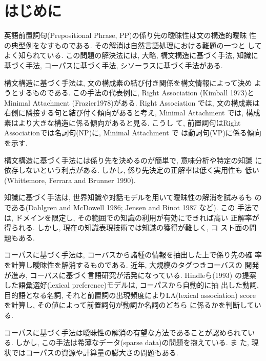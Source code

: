 

\maketitle

\section{はじめに}

英語前置詞句(Prepositional Phrase, PP)の係り先の曖昧性は文の構造的曖昧
性の典型例をなすものである. その解消は自然言語処理における難題の一つと
してよく知られている. この問題の解決法には, 大略, 構文構造に基づく手法, 
知識に基づく手法, コーパスに基づく手法, シソーラスに基づく手法がある.

構文構造に基づく手法は, 文の構成素の結び付き関係を構文情報によって決め
ようとするものである. この手法の代表例に, Right Association (Kimball
1973)とMinimal Attachment (Frazier1978)がある. Right Association では, 
文の構成素は右側に隣接する句と結び付く傾向があると考え, Minimal
Attachment では, 構成素はより大きな構造に係る傾向があると見る. こうし
て, 前置詞句はRight Associationでは名詞句(NP)に, Minimal Attachment で
は動詞句(VP)に係る傾向を示す. 

構文構造に基づく手法には係り先を決めるのが簡単で, 意味分析や特定の知識
に依存しないという利点がある. しかし, 係り先決定の正解率は低く実用性も
低い(Whittemore, Ferrara and Brunner 1990).   

知識に基づく手法は, 世界知識や対話モデルを用いて曖昧性の解消を試みるも
のである(Dahlgren and McDowell 1986; Jensen and Binot 1987 など). この
手法では, ドメインを限定し, その範囲での知識の利用が有効にできれば高い
正解率が得られる. しかし, 現在の知識表現技術では知識の獲得が難しく, コ
スト面の問題もある. 

コーパスに基づく手法は, コーバスから諸種の情報を抽出した上で係り先の確
率を計算し曖昧性を解消するものである. 近年, 大規模のタグつきコーバスの
開発が進み, コーパスに基づく言語研究が活発になっている. Hindleら(1993)
の提案した語彙選好(lexical preference)モデルは, コーパスから自動的に抽
出した動詞, 目的語となる名詞, それと前置詞の出現頻度によりLA(lexical
association) scoreを計算し, その値によって前置詞句が動詞か名詞のどちら
に係るかを判断している. 

コーパスに基づく手法は曖昧性の解消の有望な方法であることが認められてい
る. しかし, この手法は希薄なデータ(sparse data)の問題を抱えている. ま
た, 現状ではコーパスの資源や計算量の膨大さの問題もある. 

